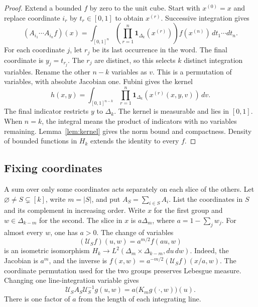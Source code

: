 \documentclass[11pt]{article}
\begin{document}
\begin{proof}
Extend a bounded $f$ by zero to the unit cube.
Start with $x^{(0)}=x$ and replace coordinate $i_r$ by $t_r\in[0,1]$
to obtain $x^{(r)}$.  Successive integration gives
\[
 (A_{i_1}\cdots A_{i_n}f)(x)
 =\int_{[0,1]^n}
   \left(\prod_{r=1}^n\mathbf1_{\Delta_k}(x^{(r)})\right)
   f(x^{(n)})\,dt_1\cdots dt_n.
\]
For each coordinate $j$, let $r_j$ be its last occurrence in the word.
The final coordinate is $y_j=t_{r_j}$.
The $r_j$ are distinct, so this selects $k$ distinct integration variables.
Rename the other $n-k$ variables as $v$.
This is a permutation of variables, with absolute Jacobian one.
Fubini gives the kernel
\begin{equation}\label{all:eq:complete-kernel}
 h(x,y)=\int_{[0,1]^{n-k}}
        \prod_{r=1}^n\mathbf1_{\Delta_k}(x^{(r)}(x,y,v))\,dv.
\end{equation}
The final indicator restricts $y$ to $\Delta_k$.
The kernel is measurable and lies in $[0,1]$.
When $n=k$, the integral means the product of indicators with no variables
remaining.  Lemma~\ref{lem:kernel} gives the norm bound and compactness.
Density of bounded functions in $H_k$ extends the identity to every $f$.
\end{proof}

\subsection{Fixing coordinates}

A sum over only some coordinates acts separately on each slice of the
others.  Let $\varnothing\ne S\subsetneq[k]$, write $m=|S|$, and put
$A_S=\sum_{i\in S}A_i$.
List the coordinates in $S$ and its complement in increasing order.
Write $x$ for the first group and $w\in\Delta_{k-m}$ for the second.
The slice in $x$ is $a\Delta_m$, where $a=1-\sum_jw_j$.
For almost every $w$, one has $a>0$.
The change of variables
\begin{equation}\label{all:eq:slice-map}
 (\mathcal U_Sf)(u,w)=a^{m/2}f(au,w)
\end{equation}
is an isometric isomorphism
$H_k\to L^2(\Delta_m\times\Delta_{k-m},du\,dw)$.
Indeed, the Jacobian is $a^m$, and the inverse is
$f(x,w)=a^{-m/2}(\mathcal U_Sf)(x/a,w)$.
The coordinate permutation used for the two groups preserves Lebesgue measure.
Changing one line-integration variable gives
\begin{equation}\label{all:eq:slice-operator}
 \mathcal U_S A_S\mathcal U_S^{-1}g(u,w)
       =a\bigl(K_mg(\cdot,w)\bigr)(u).
\end{equation}
There is one factor of $a$ from the length of each integrating line.
\end{document}

